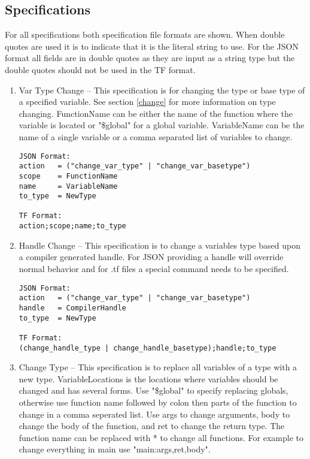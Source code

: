 \documentclass[natbib]{article}
\begin{document}
\subsection{Specifications}
For all specifications both specification file formats are shown. When double quotes 
are used it is to indicate that it is the literal string to use. For the JSON format 
all fields are in double quotes as they are input as a string type but the double quotes 
should not be used in the TF format.
\begin{enumerate}
\item{} Var Type Change -- This specification is for changing the type or base type 
of a specified variable. See section \ref{change} for more information on type changing. 
FunctionName can be either the name of the function where the variable is located or "\$global" 
for a global variable. VariableName can be the name of a single variable or a comma separated 
list of variables to change.
\begin{verbatim}
JSON Format:
action   = ("change_var_type" | "change_var_basetype")
scope    = FunctionName
name     = VariableName
to_type  = NewType

TF Format:
action;scope;name;to_type
\end{verbatim}

\item{} Handle Change -- This specification is to change a variables type based upon 
a compiler generated handle. For JSON providing a handle will override normal behavior 
and for .tf files a special command needs to be specified.

\begin{verbatim}
JSON Format:
action   = ("change_var_type" | "change_var_basetype")
handle   = CompilerHandle
to_type  = NewType

TF Format:
(change_handle_type | change_handle_basetype);handle;to_type
\end{verbatim}

\item{} Change Type -- This specification is to replace all variables of a type with a new type. 
VariableLocations is the locations where variables should be changed and has several forms. 
Use "\$global" to specify replacing globals, otherwise use function name followed by colon 
then parts of the function to change in a comma seperated list. Use args to change arguments, 
body to change the body of the function, and ret to change the return type. The function name 
can be replaced with * to change all functions. For example to change everything in main use 
"main:args,ret,body".


\end{enumerate}
\end{document}
